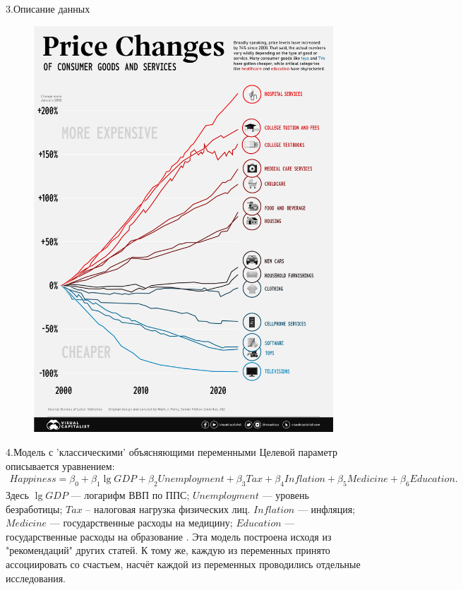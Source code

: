 \documentclass[aspectratio=169]{beamer}
\begin{document}
\begin{frame}{3.Описание данных}

\begin{figure} \label{hompic}
            \centering
            \includegraphics[scale=0.15]{price-changes-goods-services.png}
    \end{figure}
    
\end{frame}


\begin{frame}{4.Модель с ’классическими’ объясняющими переменными}
   Целевой параметр описывается уравнением:
   \footnotesize{
        \begin{align*}
         Happiness = \beta_0 + \beta_1 \lg{GDP} + \beta_2 Unemployment + \beta_3 Tax + \beta_4 Inflation + \beta_5 Medicine + \beta_6 Education.
        \end{align*}
        }
    \normalsize
    Здесь $\lg{GDP}$ --- логарифм ВВП по ППС; $Unemployment $ --- уровень безработицы; $Tax $ -- налоговая нагрузка физических лиц. $Inflation $ --- инфляция; $Medicine $ --- государственные расходы на медицину; $Education $ --- государственные расходы на образование .
\hfill \break
\hfill \break
    Эта модель построена исходя из "рекомендаций" других статей. К тому же, каждую из переменных принято ассоциировать со счастьем, насчёт каждой из переменных проводились отдельные исследования.

\end{frame}
\end{document}
